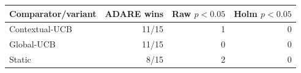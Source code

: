 \begin{tabular}{lrrr}
\toprule
Comparator/variant & ADARE wins & Raw $p<0.05$ & Holm $p<0.05$ \\
\midrule
Contextual-UCB & 11/15 & 1 & 0 \\
Global-UCB & 11/15 & 0 & 0 \\
Static & 8/15 & 2 & 0 \\
\bottomrule
\end{tabular}
